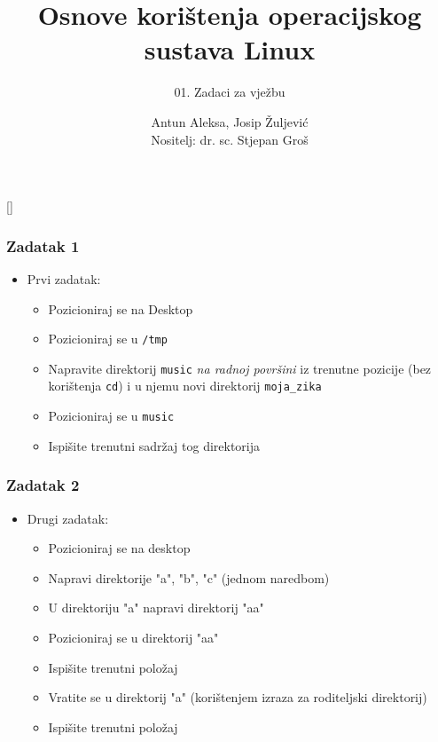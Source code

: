 \documentclass{beamer}
\title{Osnove korištenja operacijskog sustava Linux}
\subtitle{01. Zadaci za vježbu}
\author[Antun Aleksa, Josip Žuljević]{Antun Aleksa, Josip Žuljević\\{\small Nositelj: dr. sc. Stjepan Groš}}
\institute[FER]{Sveučilište u Zagrebu \\
				Fakultet elektrotehnike i računarstva}
\date{\todayiso}
\newcommand{\shell}[1]{\texttt{#1}}
\begin{document}
{
[] %

\begin{frame}
\maketitle
\end{frame}
}

\begin{frame}[t]
\frametitle{Zadatak 1}
\begin{itemize}
  \item Prvi zadatak:
  \begin{itemize}
    \item Pozicioniraj se na Desktop
    \item Pozicioniraj se u \shell{/tmp}
    \item Napravite direktorij \shell{music} \emph{na radnoj površini} iz trenutne pozicije (bez korištenja \shell{cd}) i u njemu novi direktorij \shell{moja\_zika}
	\item Pozicioniraj se u \shell{music}
	\item Ispišite trenutni sadržaj tog direktorija
  \end{itemize}
\end{itemize}
\end{frame}

\begin{frame}[t]
\frametitle{Zadatak 2}
\begin{itemize}
  \item Drugi zadatak:
  \begin{itemize}
    \item Pozicioniraj se na desktop
    \item Napravi direktorije "a", "b", "c" (jednom naredbom)
    \item U direktoriju "a" napravi direktorij "aa"
	\item Pozicioniraj se u direktorij "aa"
	\item Ispišite trenutni položaj
	\item Vratite se u direktorij "a" (korištenjem izraza za roditeljski direktorij)
	\item Ispišite trenutni položaj
  \end{itemize}
\end{itemize}
\end{frame}
\end{document}
